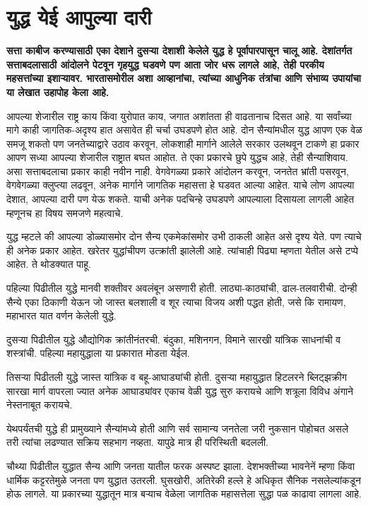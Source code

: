 \chapter{युद्ध येई आपुल्या दारी}

{\textbf{सत्ता काबीज करण्यासाठी एका देशाने दुसऱ्या देशाशी केलेले युद्ध हे पूर्वापारपासून चालू आहे. देशांतर्गत सत्ताबदलासाठी आंदोलने पेटवून गृहयुद्ध घडवणे पण आता जोर धरू लागले आहे, तेही परकीय महसत्तांच्या इशाऱ्यावर. भारतासमोरील अशा आव्हानांचा, त्यांच्या आधुनिक तंत्रांचा आणि संभाव्य उपायांचा या लेखात उहापोह केला आहे.}}

आपल्या शेजारील राष्ट्र काय किंवा युरोपात काय, जगात अशांतता ही वाढतानाच दिसत आहे. या सर्वांच्या मागे काही जागतिक-अदृश्य हात असावेत ही चर्चा उघडपणे होत आहे. दोन सैन्यांमधील युद्ध आपण एक वेळ समजू शकतो पण जनतेच्याद्वारे उठाव करवून, लोकशाही मार्गाने आलेले सरकार उलथवून टाकणे हा प्रकार आपण सध्या आपल्या शेजारील राष्ट्रात बघत आहोत. ते एका प्रकारचे छुपे युद्धच आहे, तेही सैन्याशिवाय. असा सत्ताबदलाचा प्रकार काही नवीन नाही. वेगवेगळ्या प्रकारे आंदोलन करवून, जनतेत भ्रांती पसरवून, वेगवेगळ्या क्लुप्त्या लढवून, अनेक मार्गाने जागतिक महासत्ता हे घडवत आल्या आहेत. याचे लोण आपल्या देशात, आपल्या दारी पण येऊ शकते. याची अनेक पदचिन्हे उघडपणे आपल्याला दिसायला लागली आहेत म्हणूनच हा विषय समजणे महत्वाचे.

युद्ध म्हटले की आपल्या डोळ्यासमोर दोन सैन्य एकमेकांसमोर उभी ठाकली आहेत असे दृश्य येते. पण त्याचे ही अनेक प्रकार आहेत. खरेतर युद्धांचीपण उत्क्रांती झालेली आहे. त्यांचाही पिढ्या म्हणता येतील असे टप्पे आहेत. ते थोडक्यात पाहू.

पहिल्या पिढीतील युद्धे मानवी शक्तीवर अवलंबून असणारी होती. लाठ्या-काठ्यांची, ढाल-तलवारीची. दोन्ही सैन्ये एका ठिकाणी येऊन जो जास्त बलशाली व शूर त्याचा विजय अशी पद्धत होती, जसे कि रामायण, महाभारत यात वर्णन केलेली युद्धे.

दुसऱ्या पिढीतील युद्धे औद्योगिक क्रांतीनंतरची. बंदुका, मशिनगन, विमाने सारखी यांत्रिक साधनांची व शस्त्रांची. पहिल्या महायुद्धाला या प्रकारात मोडता येईल.

तिसऱ्या पिढीतली युद्धे जास्त यांत्रिक व बहू-आघाड्यांची होती. दुसऱ्या महायुद्धात हिटलरने ब्लिट्झक्रीग सारखा मार्ग वापरला ज्यात अनेक आघाड्यांवर एकाच वेळी युद्ध सुरु करायचे आणि शत्रूला विविध अंगाने नेस्तनाबूत करायचे.

येथपर्यंतची युद्धे ही प्रामुख्याने सैन्यांमध्ये होती आणि सर्व सामान्य जनतेला जरी नुकसान पोहोचत असले तरी त्यांचा लढण्यात सक्रिय सहभाग नव्हता. यापुढे मात्र ही परिस्थिती बदलली.

चौथ्या पिढीतील युद्धात सैन्य आणि जनता यातील फरक अस्पष्ट झाला. देशभक्तीच्या भावनेनें म्हणा किंवा धार्मिक कट्टरतेमुळे जनता पण युद्धात उतरली. घुसखोरी, अतिरेकी हल्ले हे अधिकृत सैनिक नसलेल्यांकडून होऊ लागले. या प्रकारच्या युद्धातून मात्र बऱ्याच वेळेला जागतिक महासत्तेला सुद्धा पळ काढावा लागला आहे.

